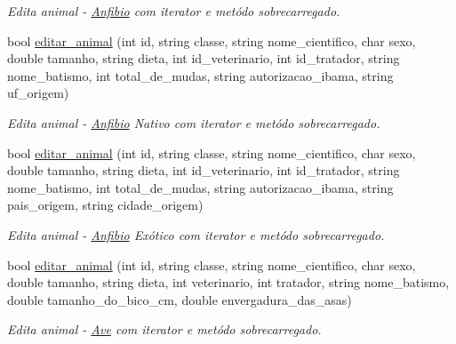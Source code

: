 \begin{DoxyCompactItemize}
\begin{DoxyCompactList}\small\item\em Edita animal -\/ \mbox{\hyperlink{class_anfibio}{Anfibio}} com iterator e metódo sobrecarregado. \end{DoxyCompactList}\item 
\mbox{\label{class_sistema_ada7f73da98649c1ea42a7ce58609d2e7}} 
bool \mbox{\hyperlink{class_sistema_ada7f73da98649c1ea42a7ce58609d2e7}{editar\+\_\+animal}} (int id, string classe, string nome\+\_\+cientifico, char sexo, double tamanho, string dieta, int id\+\_\+veterinario, int id\+\_\+tratador, string nome\+\_\+batismo, int total\+\_\+de\+\_\+mudas, string autorizacao\+\_\+ibama, string uf\+\_\+origem)
\begin{DoxyCompactList}\small\item\em Edita animal -\/ \mbox{\hyperlink{class_anfibio}{Anfibio}} Nativo com iterator e metódo sobrecarregado. \end{DoxyCompactList}\item 
\mbox{\label{class_sistema_a76c734aab144f2592674d3c1785e4a37}} 
bool \mbox{\hyperlink{class_sistema_a76c734aab144f2592674d3c1785e4a37}{editar\+\_\+animal}} (int id, string classe, string nome\+\_\+cientifico, char sexo, double tamanho, string dieta, int id\+\_\+veterinario, int id\+\_\+tratador, string nome\+\_\+batismo, int total\+\_\+de\+\_\+mudas, string autorizacao\+\_\+ibama, string pais\+\_\+origem, string cidade\+\_\+origem)
\begin{DoxyCompactList}\small\item\em Edita animal -\/ \mbox{\hyperlink{class_anfibio}{Anfibio}} Exótico com iterator e metódo sobrecarregado. \end{DoxyCompactList}\item 
\mbox{\label{class_sistema_a0e3132f3ebbd57c75326d3ec643f023d}} 
bool \mbox{\hyperlink{class_sistema_a0e3132f3ebbd57c75326d3ec643f023d}{editar\+\_\+animal}} (int id, string classe, string nome\+\_\+cientifico, char sexo, double tamanho, string dieta, int veterinario, int tratador, string nome\+\_\+batismo, double tamanho\+\_\+do\+\_\+bico\+\_\+cm, double envergadura\+\_\+das\+\_\+asas)
\begin{DoxyCompactList}\small\item\em Edita animal -\/ \mbox{\hyperlink{class_ave}{Ave}} com iterator e metódo sobrecarregado. \end{DoxyCompactList}\item 

\end{DoxyCompactItemize}
